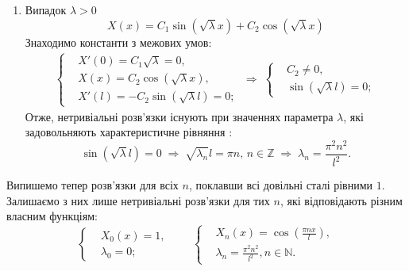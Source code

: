 \begin{enumerate}
\begin{enumerate}[wide, labelindent=0pt]
        \item Випадок $\lambda > 0$
        \begin{equation*}
            X(x) = C_1 \sin(\sqrt{\lambda}x) + C_2 \cos({\sqrt{\lambda}x})
        \end{equation*}
        Знаходимо константи з межових умов:
        \begin{equation*}
            \begin{aligned}
                \left\{ \begin{aligned}
                    &X'(0) = C_1\sqrt{\lambda} = 0, \\ 
                    &X(x) = C_2 \cos({\sqrt{\lambda}x}), \\
                    &X'(l) = - C_2 \sin(\sqrt{\lambda}l) = 0;
                \end{aligned} \right.
                \;\Rightarrow\;
                \left\{ \begin{aligned}
                    &C_2 \neq 0, \\ 
                    &\sin(\sqrt{\lambda}l) = 0;
                \end{aligned} \right.
            \end{aligned}
        \end{equation*}
        Отже, нетривіальні розв'язки існують при значеннях параметра $\lambda$, які задовольняють характеристичне рівняння :
        \begin{equation*}
            \sin(\sqrt{\lambda}l) = 0
            \;\Rightarrow\;
            \sqrt{\lambda_n}l = \pi n, \, n \in \mathbb{Z}
            \;\Rightarrow\;
            \lambda_n = \frac{\pi^2 n^2}{l^2}.
        \end{equation*}
    \end{enumerate}
\end{enumerate} 
Випишемо тепер розв'язки для всіх $n$, поклавши всі довільні сталі рівними $1$. Залишаємо з них лише нетривіальні розв'язки для тих $n$, які відповідають різним власним функціям:
    \begin{equation*}
        \left\{ \begin{aligned}
            &X_0(x) = 1,\\
            &\lambda_0 = 0;
        \end{aligned} \right.
        \qquad
        \left\{ \begin{aligned}
            &X_n(x) = \cos\left(\frac{\pi n x}{l}\right),\\
            &\lambda_n = \frac{\pi^2 n^2}{l^2}, n \in \mathbb{N}.
        \end{aligned} \right.
    \end{equation*}



